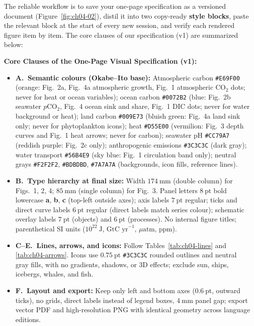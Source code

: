 The reliable workflow is to save your one-page specification as a versioned document (Figure~\ref{fig:ch04-02}), distil it into two copy-ready \textbf{style blocks}, paste the relevant block at the start of every new session, and verify each rendered figure item by item. The core clauses of our specification (v1) are summarized below:

\begin{BookNote}
\textbf{Core Clauses of the One-Page Visual Specification (v1):}
\begin{itemize}
\item \textbf{A.\ Semantic colours (Okabe--Ito base):} Atmospheric carbon \texttt{\#E69F00} (orange: Fig.\ 2a, Fig.\ 4a atmospheric growth, Fig.\ 1 atmospheric $\text{CO}_2$ dots; never for heat or ocean variables); ocean carbon \texttt{\#0072B2} (blue: Fig.\ 2b seawater $p\text{CO}_2$, Fig.\ 4 ocean sink and share, Fig.\ 1 DIC dots; never for water background or heat); land carbon \texttt{\#009E73} (bluish green: Fig.\ 4a land sink only; never for phytoplankton icons); heat \texttt{\#D55E00} (vermilion: Fig.\ 3 depth curves and Fig.\ 1 heat arrows; never for carbon); seawater pH \texttt{\#CC79A7} (reddish purple: Fig.\ 2c only); anthropogenic emissions \texttt{\#3C3C3C} (dark gray); water transport \texttt{\#56B4E9} (sky blue: Fig.\ 1 circulation band only); neutral grays \texttt{\#F2F2F2}, \texttt{\#BDBDBD}, \texttt{\#7A7A7A} (backgrounds, icon fills, reference lines).
\item \textbf{B.\ Type hierarchy at final size:} Width $174\ \text{mm}$ (double column) for Figs.\ 1, 2, 4; $85\ \text{mm}$ (single column) for Fig.\ 3. Panel letters $8\ \text{pt}$ bold lowercase \textbf{a}, \textbf{b}, \textbf{c} (top-left outside axes); axis labels $7\ \text{pt}$ regular; ticks and direct curve labels $6\ \text{pt}$ regular (direct labels match series colour); schematic overlay labels $7\ \text{pt}$ (objects) and $6\ \text{pt}$ (processes). No internal figure titles; parenthetical SI units ($10^{22}\ \text{J}$, $\text{GtC yr}^{-1}$, $\mu\text{atm}$, ppm).
\item \textbf{C--E.\ Lines, arrows, and icons:} Follow Tables~\ref{tab:ch04-lines} and \ref{tab:ch04-arrows}. Icons use $0.75\ \text{pt}$ \texttt{\#3C3C3C} rounded outlines and neutral gray fills, with no gradients, shadows, or 3D effects; exclude sun, ships, icebergs, whales, and fish.
\item \textbf{F.\ Layout and export:} Keep only left and bottom axes ($0.6\ \text{pt}$, outward ticks), no grids, direct labels instead of legend boxes, $4\ \text{mm}$ panel gap; export vector PDF and high-resolution PNG with identical geometry across language editions.
\end{itemize}
\end{BookNote}

